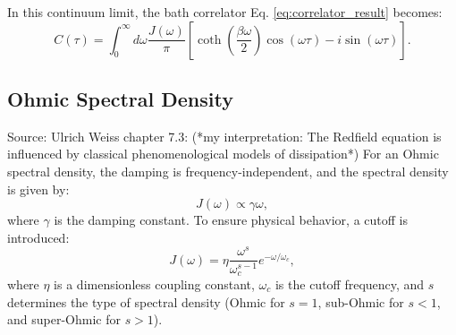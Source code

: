 In this continuum limit, the bath correlator Eq. \eqref{eq:correlator_result} becomes:
\begin{equation} \label{eq:correlator_final}
	C(\tau) = \int_0^\infty d\omega \frac{J(\omega)}{\pi} \left[ \coth\left( \frac{\beta \omega}{2} \right) \cos(\omega \tau) - i \sin(\omega \tau) \right].
\end{equation}

\subsection{Ohmic Spectral Density}
\label{subsec:ohmic_spectral_density}

Source: Ulrich Weiss chapter 7.3:
(*my interpretation: The Redfield equation is influenced by classical phenomenological models of dissipation*)
For an Ohmic spectral density, the damping is frequency-independent, and the spectral density is given by:
\begin{equation} \label{eq:ohmic_spectral_density}
	J(\omega) \propto \gamma \omega,
\end{equation}
where \( \gamma \) is the damping constant. To ensure physical behavior, a cutoff is introduced:
\begin{equation} \label{eq:cutoff_spectral_density}
	J(\omega) = \eta \frac{\omega^s}{\omega_c^{s-1}} e^{-\omega / \omega_c},
\end{equation}
where \( \eta \) is a dimensionless coupling constant, \( \omega_c \) is the cutoff frequency, and \( s \) determines the type of spectral density (Ohmic for \( s = 1 \), sub-Ohmic for \( s < 1 \), and super-Ohmic for \( s > 1 \)).
